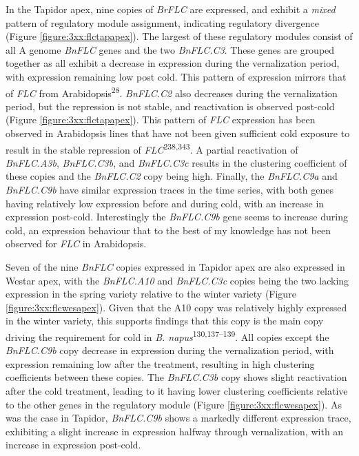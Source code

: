 \documentclass[12pt,]{book}
\begin{document}
In the Tapidor apex, nine copies of \emph{BrFLC} are expressed, and
exhibit a \emph{mixed} pattern of regulatory module assignment,
indicating regulatory divergence (Figure \ref{figure:3xx:flctapapex}).
The largest of these regulatory modules consist of all A genome
\emph{BnFLC} genes and the two \emph{BnFLC.C3}. These genes are grouped
together as all exhibit a decrease in expression during the
vernalization period, with expression remaining low post cold. This
pattern of expression mirrors that of \emph{FLC} from
Arabidopsis\textsuperscript{28}. \emph{BnFLC.C2} also decreases during
the vernalization period, but the repression is not stable, and
reactivation is observed post-cold (Figure \ref{figure:3xx:flctapapex}).
This pattern of \emph{FLC} expression has been observed in Arabidopsis
lines that have not been given sufficient cold exposure to result in the
stable repression of \emph{FLC}\textsuperscript{238,343}. A partial
reactivation of \emph{BnFLC.A3b}, \emph{BnFLC.C3b}, and \emph{BnFLC.C3c}
results in the clustering coefficient of these copies and the
\emph{BnFLC.C2} copy being high. Finally, the \emph{BnFLC.C9a} and
\emph{BnFLC.C9b} have similar expression traces in the time series, with
both genes having relatively low expression before and during cold, with
an increase in expression post-cold. Interestingly the \emph{BnFLC.C9b}
gene seems to increase during cold, an expression behaviour that to the
best of my knowledge has not been observed for \emph{FLC} in
Arabidopsis.

Seven of the nine \emph{BnFLC} copies expressed in Tapidor apex are also
expressed in Westar apex, with the \emph{BnFLC.A10} and \emph{BnFLC.C3c}
copies being the two lacking expression in the spring variety relative
to the winter variety (Figure \ref{figure:3xx:flcwesapex}). Given that
the A10 copy was relatively highly expressed in the winter variety, this
supports findings that this copy is the main copy driving the
requirement for cold in \emph{B. napus}\textsuperscript{130,137--139}.
All copies except the \emph{BnFLC.C9b} copy decrease in expression
during the vernalization period, with expression remaining low after the
treatment, resulting in high clustering coefficients between these
copies. The \emph{BnFLC.C3b} copy shows slight reactivation after the
cold treatment, leading to it having lower clustering coefficients
relative to the other genes in the regulatory module (Figure
\ref{figure:3xx:flcwesapex}). As was the case in Tapidor,
\emph{BnFLC.C9b} shows a markedly different expression trace, exhibiting
a slight increase in expression halfway through vernalization, with an
increase in expression post-cold.
\end{document}
